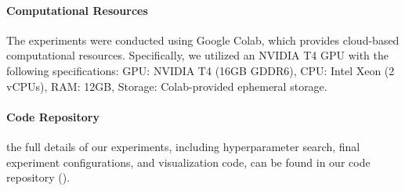 


\paragraph{Computational Resources}
The experiments were conducted using Google Colab, which provides cloud-based computational resources. Specifically, we utilized an NVIDIA T4 GPU with the following specifications: GPU: NVIDIA T4 (16GB GDDR6), CPU: Intel Xeon (2 vCPUs), RAM: 12GB, Storage: Colab-provided ephemeral storage. 


\paragraph{Code Repository}
the
full details of our experiments, including hyperparameter search, final experiment configurations, and visualization code,
can be found in our code repository ({\color{blue}\rawcoderepo}).


